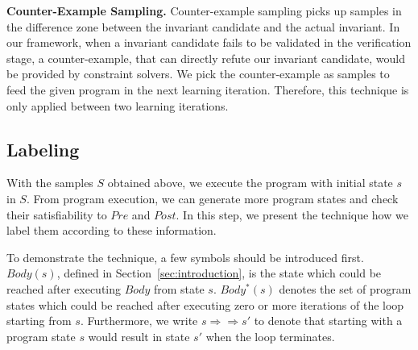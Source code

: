 \medskip\noindent
\textbf{Counter-Example Sampling.}
Counter-example sampling picks up samples in the difference zone between the invariant candidate and the actual invariant.
In our framework, when a invariant candidate fails to be validated in the verification stage,
a counter-example, that can directly refute our invariant candidate, would be provided by constraint solvers.
We pick the counter-example as samples to feed the given program in the next learning iteration.
Therefore, this technique is only applied between two learning iterations.



\subsection {Labeling}
With the samples $S$ obtained above, we execute the program with initial state $s$ in $S$. 
From program execution, we can generate more program states and check their satisfiability to $Pre$ and $Post$.
In this step, we present the technique how we label them according to these information. 

To demonstrate the technique, a few symbols should be introduced first. 
$Body(s)$, defined in Section~\ref{sec:introduction}, is the state which could be reached after executing $Body$ from state $s$.
$Body^*(s)$ denotes the set of program states which could be reached after executing zero or more iterations of the loop starting from $s$.
Furthermore, we write $s \Rightarrow\Rightarrow s'$ to denote that starting with a program state $s$ would result in state $s'$ when the loop terminates. 

